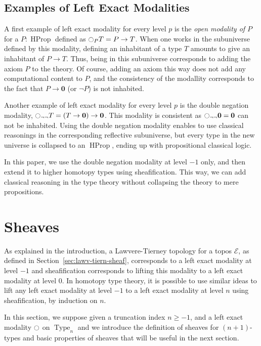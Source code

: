 \documentclass[conference]{IEEEtran}
\DeclareMathOperator{\Type}{Type}
\DeclareMathOperator{\HProp}{HProp}
\newcommand{\modal}{\ensuremath{\ocircle}}
\newcommand \E {\mathcal{E}}
\newcommand \zero {\mathbf{0}}
\begin{document}
\subsection{Examples of Left Exact Modalities}
\label{sec:examples-left-exact}

A first example of left exact modality for every level $p$ is the {\em
  open modality of $P$} for a $P:\HProp$ defined as
$\modal_P T = P \to T$.
%
When one works in
the subuniverse defined by this modality, defining an inhabitant of a
type $T$ amounts to give an inhabitant of $P \to T$. 
%
Thus, being in this subuniverse corresponds to adding the axiom $P$ to the
theory. Of course, adding an axiom this way does not add any computational
content to $P$, and the consistency of the modallity corresponds to
the fact that $P \to \zero$ (or $\lnot P$) is not inhabited.

Another example of left exact modality for every level $p$ is the
double negation modality,
$\modal_{\lnot\lnot} T = (T \to \zero) \to \zero$.
%
This modality is consistent as $\modal_{\lnot\lnot} \zero = \zero$ can
not be inhabited.
%
Using the double negation modality enables to use classical reasonings
in the corresponding reflective subuniverse, but every type in the new
universe is collapsed to an $\HProp$, ending up with propositional
classical logic.

In this paper, we use the double negation modality at level $-1$ only,
and then extend it to higher homotopy types using sheafification. This
way, we can add classical reasoning in the type theory without
collapsing the theory to mere propositions.




\section{Sheaves}
\label{sec:sheaves}

As explained in the introduction, a Lawvere-Tierney topology for a
topos $\E$, as defined in Section~\ref{sec:lawv-tiern-sheaf},
corresponds to a left exact modality at level $-1$
%
and sheafification corresponds to lifting this modality to a left
exact modality at level $0$.
%
In homotopy type theory, it is possible to use similar ideas to lift
any left exact modality at level $-1$ to a left exact modality at level
$n$ using sheafification, by induction on $n$.

In this section, we suppose given a truncation index $n\geqslant -1$,
and a left exact modality $\modal$ on $\Type_n$ and we introduce the
definition of sheaves for $(n+1)$-types and basic properties of
sheaves that will be useful in the next section. 
\end{document}
